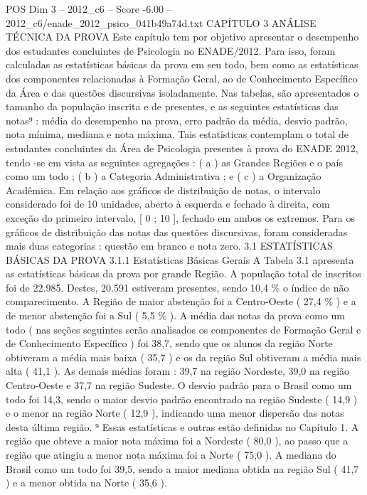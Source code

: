 \begin{textsample}{POS Dim 3 – 2012\_c6 – Score -6.00 – 2012\_c6/enade\_2012\_psico\_041b49a74d.txt}  \label{ex:f3_pos_257}
CAPÍTULO 3 ANÁLISE TÉCNICA DA PROVA Este capítulo tem por objetivo apresentar o desempenho dos estudantes concluintes de Psicologia no ENADE/2012.
Para isso, foram calculadas as estatísticas básicas da prova em seu todo, bem como as estatísticas dos componentes relacionadas à Formação Geral, ao de Conhecimento Específico da Área e das questões discursivas isoladamente.
Nas tabelas, são apresentados o tamanho da população inscrita e de presentes, e as seguintes estatísticas das notas⁹ : média do desempenho na prova, erro padrão da média, desvio padrão, nota mínima, mediana e nota máxima.
Tais estatísticas contemplam o total de estudantes concluintes da Área de Psicologia presentes à prova do ENADE 2012, tendo -se em vista as seguintes agregações : ( a ) as Grandes Regiões e o país como um todo ; ( b ) a Categoria Administrativa ; e ( c ) a Organização Acadêmica.
Em relação aos gráficos de distribuição de notas, o intervalo considerado foi de 10 unidades, aberto à esquerda e fechado à direita, com exceção do primeiro intervalo, [ 0 ; 10 ], fechado em ambos os extremos.
Para os gráficos de distribuição das notas das questões discursivas, foram consideradas mais duas categorias : questão em branco e nota zero. 3.1 ESTATÍSTICAS BÁSICAS DA PROVA 3.1.1 Estatísticas Básicas Gerais A Tabela 3.1 apresenta as estatísticas básicas da prova por grande Região.
A população total de inscritos foi de 22.985.
Destes, 20.591 estiveram presentes, sendo 10,4 \% o índice de não comparecimento.
A Região de maior abstenção foi a Centro-Oeste ( 27,4 \% ) e a de menor abstenção foi a Sul ( 5,5 \% ).
A média das notas da prova como um todo ( nas seções seguintes serão analisados os componentes de Formação Geral e de Conhecimento Específico ) foi 38,7, sendo que os alunos da região Norte obtiveram a média mais baixa ( 35,7 ) e os da região Sul obtiveram a média mais alta ( 41,1 ).
As demais médias foram : 39,7 na região Nordeste, 39,0 na região Centro-Oeste e 37,7 na região Sudeste.
O desvio padrão para o Brasil como um todo foi 14,3, sendo o maior desvio padrão encontrado na região Sudeste ( 14,9 ) e o menor na região Norte ( 12,9 ), indicando uma menor dispersão das notas desta última região. ⁹ Essas estatísticas e outras estão definidas no Capítulo 1.
A região que obteve a maior nota máxima foi a Nordeste ( 80,0 ), ao passo que a região que atingiu a menor nota máxima foi a Norte ( 75,0 ).
A mediana do Brasil como um todo foi 39,5, sendo a maior mediana obtida na região Sul ( 41,7 ) e a menor obtida na Norte ( 35,6 ).

\end{textsample}
